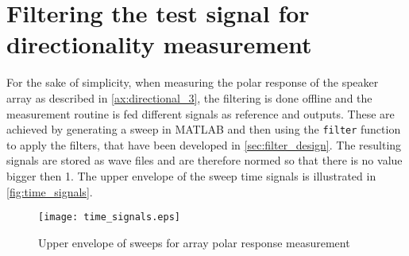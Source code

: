 \section{Filtering the test signal for directionality measurement}\label{sec:signal_filtering}
For the sake of simplicity, when measuring the polar response of the speaker array as described in \autoref{ax:directional_3}, the filtering is done offline and the measurement routine is fed different signals as reference and outputs. These are achieved by generating a sweep in MATLAB and then using the \texttt{filter} function to apply the filters, that have been developed in \autoref{sec:filter_design}. The resulting signals are stored as wave files and are therefore normed so that there is no value bigger then 1.
The upper envelope of the sweep time signals is illustrated in \autoref{fig:time_signals}.
\begin{figure}[H]
	\centering
	\texttt{[image: time\_signals.eps]}
	\caption{Upper envelope of sweeps for array polar response measurement}
	\label{fig:time_signals}
\end{figure}